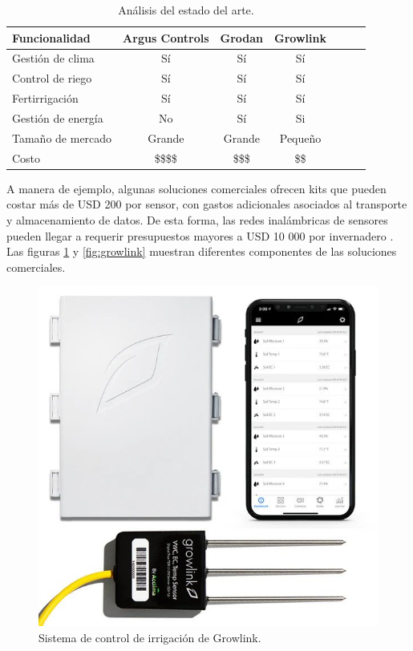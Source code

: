 \begin{table}[h]
\centering
\caption[Análisis del estado del arte]{Análisis del estado del arte.}

\begin{tabular}{lcccccc} 
\toprule
\textbf{Funcionalidad} & \textbf{Argus Controls \citep{arguscontrol}} &\textbf{Grodan \citep{grodan}} & \textbf{Growlink \citep{growlink}}\\

\midrule
Gestión de clima    & Sí & Sí & Sí \\
Control de riego    & Sí & Sí & Sí \\
Fertirrigación      & Sí & Sí & Sí \\
Gestión de energía  & No & Sí & Si \\
Tamaño de mercado   & Grande & Grande & Pequeño \\
Costo               &  \$\$\$\$ & \$\$\$ &  \$\$ \\
\bottomrule
\hline
\end{tabular}
\label{tab:vendors}
\end{table}

\pagebreak
A manera de ejemplo, algunas soluciones comerciales ofrecen kits que pueden costar más de USD 200 por sensor, con gastos adicionales asociados al transporte y almacenamiento de datos. De esta forma, las redes inalámbricas de sensores pueden llegar a requerir presupuestos mayores a USD 10 000 por invernadero \citep{digger:1}. Las figuras \ref{fig:grodan} y \ref{fig:growlink} muestran diferentes componentes de las soluciones comerciales. 

\begin{figure}[htb]
\centering 
\includegraphics[width=.5\textwidth]{../Figures/growlink.jpg}
\caption[Sistema de control de irrigación de Growlink]{Sistema de control de irrigación de Growlink\protect\footnotemark.}
\label{fig:grodan}
\end{figure}


